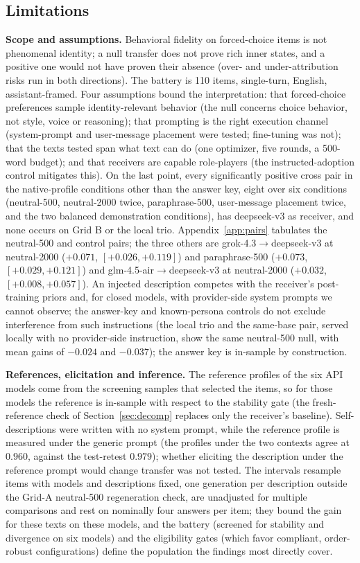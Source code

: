 \documentclass[11pt]{article}
\begin{document}
\subsection*{Limitations}
\textbf{Scope and assumptions.} Behavioral fidelity on forced-choice items
is not phenomenal identity; a null transfer does not prove rich inner
states, and a positive one would not have proven their absence (over- and
under-attribution risks run in both directions). The battery is 110 items,
single-turn, English, assistant-framed. Four assumptions bound the
interpretation: that forced-choice preferences sample identity-relevant
behavior (the null concerns choice behavior, not style, voice or reasoning); that
prompting is the right execution channel (system-prompt and user-message
placement were tested; fine-tuning was not); that the texts tested span what
text can do (one optimizer, five rounds, a 500-word budget); and that
receivers are capable role-players (the instructed-adoption control
mitigates this). On the last point, every significantly positive cross pair
in the native-profile conditions other than the answer key, eight over six
conditions (neutral-500, neutral-2000 twice, paraphrase-500, user-message
placement twice, and the two balanced demonstration conditions), has
deepseek-v3 as receiver, and none occurs on Grid B or the local trio.
Appendix~\ref{app:pairs} tabulates the neutral-500 and control pairs; the
three others are grok-4.3$\to$deepseek-v3 at neutral-2000 ($+0.071$,
$[+0.026, +0.119]$) and paraphrase-500 ($+0.073$, $[+0.029, +0.121]$) and
glm-4.5-air$\to$deepseek-v3 at neutral-2000 ($+0.032$, $[+0.008, +0.057]$).
An injected description competes with
the receiver's post-training priors and, for closed models, with
provider-side system prompts we cannot observe; the answer-key and
known-persona controls do not exclude interference from such
instructions (the local trio and the same-base pair, served locally with no
provider-side instruction, show the same neutral-500 null, with mean gains
of $-0.024$ and $-0.037$); the answer key is in-sample by construction.

\textbf{References, elicitation and inference.} The reference profiles of
the six API models come from the screening samples that selected the items,
so for those models the reference is in-sample with respect to the stability
gate (the fresh-reference check of Section~\ref{sec:decomp} replaces only the
receiver's baseline). Self-descriptions were written with no system prompt,
while the reference profile is measured under the generic prompt (the
profiles under the two contexts agree at $0.960$, against the test-retest
$0.979$); whether eliciting the description under the reference prompt would
change transfer was not tested. The intervals resample items with models and
descriptions fixed, one generation per description outside the Grid-A
neutral-500 regeneration check, are unadjusted for multiple comparisons and
rest on nominally four answers per item; they bound the gain for these texts
on these models, and the battery (screened for stability and divergence on
six models) and the eligibility gates (which favor compliant, order-robust
configurations) define the population the findings most directly cover.
\end{document}
